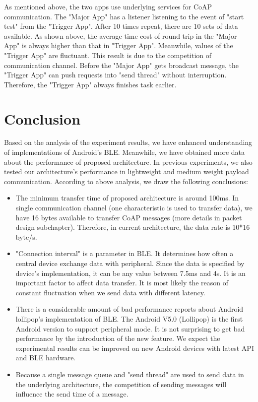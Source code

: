 \documentclass{Nan_Thesis}
\begin{document}
As mentioned above, the two apps use underlying services for CoAP communication. The "Major App" has a listener listening to the event of "start test" from the "Trigger App". After 10 times repeat, there are 10 sets of data available. As shown above, the average time cost of round trip in the "Major App" is always higher than that in "Trigger App". Meanwhile, values of the "Trigger App" are fluctuant. This result is due to the competition of communication channel. Before the "Major App" gets broadcast message, the "Trigger App" can push requests into "send thread" without interruption. Therefore, the "Trigger App" always finishes task earlier.
\section{Conclusion}
Based on the analysis of the experiment results, we have enhanced understanding of implementations of Android’s BLE. Meanwhile, we have obtained more data about the performance of proposed architecture. In previous experiments, we also tested our architecture’s performance in lightweight and medium weight payload communication. According to above analysis, we draw the following conclusions:

\begin{itemize}
  \item The minimum transfer time of proposed architecture is around 100ms. In single communication channel (one characteristic is used to transfer data), we have 16 bytes available to transfer CoAP messages (more details in packet design subchapter). Therefore, in current architecture, the data rate is 10*16 byte/s. 
  \item "Connection interval" is a parameter in BLE. It determines how often a central device exchange data with peripheral. Since the data is specified by device’s implementation, it can be any value between 7.5ms and 4s. It is an important factor to affect data transfer. It is most likely the reason of constant fluctuation when we send data with different latency.
  \item There is a considerable amount of bad performance reports about Android lollipop's implementation of BLE. The Android V5.0 (Lollipop) is the first Android version to support peripheral mode. It is not surprising to get bad performance by the introduction of the new feature. We expect the experimental results can be improved on new Android devices with latest API and BLE hardware. 
  \item Because a single message queue and "send thread" are used to send data in the underlying architecture, the competition of sending messages will influence the send time of a message. 
\end{itemize}
\end{document}
